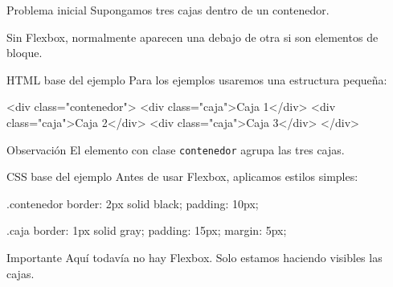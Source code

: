 \documentclass[aspectratio=169,11.5pt]{beamer}
\begin{document}
    \begin{frame}{Problema inicial}
        Supongamos tres cajas dentro de un contenedor.

        Sin Flexbox, normalmente aparecen una debajo de otra
        si son elementos de bloque.

        \begin{center}
        \end{center}
    \end{frame}

    \begin{frame}[fragile]{HTML base del ejemplo}
        Para los ejemplos usaremos una estructura pequeña:

        \begin{htmlcodedark}
            <div class="contenedor">
            <div class="caja">Caja 1</div>
            <div class="caja">Caja 2</div>
            <div class="caja">Caja 3</div>
            </div>
        \end{htmlcodedark}

        \begin{block}{Observación}
            El elemento con clase \texttt{contenedor}
            agrupa las tres cajas.
        \end{block}
    \end{frame}

    \begin{frame}[fragile]{CSS base del ejemplo}
        Antes de usar Flexbox, aplicamos estilos simples:

        \begin{csscodedark}
            .contenedor {
                border: 2px solid black;
                padding: 10px;
            }

            .caja {
                border: 1px solid gray;
                padding: 15px;
                margin: 5px;
            }
        \end{csscodedark}

        \begin{block}{Importante}
            Aquí todavía no hay Flexbox.
            Solo estamos haciendo visibles las cajas.
        \end{block}
    \end{frame}
\end{document}

